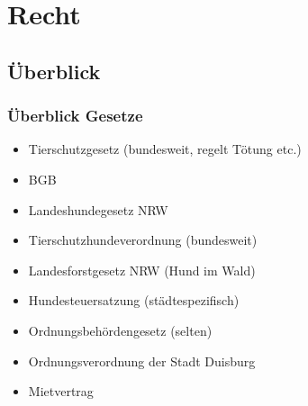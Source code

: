 \chapter{Recht}


\section{Überblick}

    \subsection{Überblick Gesetze}
    \begin{itemize}
        \item Tierschutzgesetz (bundesweit, regelt Tötung etc.)
        \item BGB
        \item Landeshundegesetz NRW
        \item Tierschutzhundeverordnung (bundesweit)
        \item Landesforstgesetz NRW (Hund im Wald)
        \item Hundesteuersatzung (städtespezifisch)
        \item Ordnungsbehördengesetz (selten)
        \item Ordnungsverordnung der Stadt Duisburg
        \item Mietvertrag
    \end{itemize}

    \clearpage
